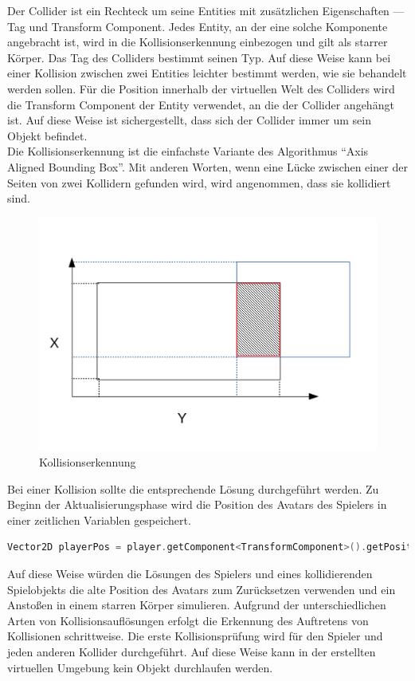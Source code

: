 \documentclass[
  10pt,
  a4paper,
  oneside,
  headers,
  headinclude,
  footinclude,
  BCOR5mm,
]{article}
\begin{document}
Der Collider ist ein Rechteck um seine Entities mit zusätzlichen Eigenschaften
--- Tag und Transform Component. Jedes Entity, an der eine solche Komponente
angebracht ist, wird in die Kollisionserkennung einbezogen und gilt als starrer
Körper. Das Tag des Colliders bestimmt seinen Typ. Auf diese Weise kann bei
einer Kollision zwischen zwei Entities leichter bestimmt werden, wie sie
behandelt werden sollen. Für die Position innerhalb der virtuellen Welt des
Colliders wird die Transform Component der Entity verwendet, an die der Collider
angehängt ist. Auf diese Weise ist sichergestellt, dass sich der Collider immer
um sein Objekt befindet. \\
Die Kollisionserkennung ist die einfachste Variante des Algorithmus ``Axis
Aligned Bounding Box''. Mit anderen Worten, wenn eine Lücke zwischen einer der
Seiten von zwei Kollidern gefunden wird, wird angenommen, dass sie kollidiert
sind.

\begin{figure}[h]
  \centering
  \includegraphics[scale=0.75]{AABB_Collision}
  \caption{Kollisionserkennung}
  \label{fig:Kollisionserkennung}
\end{figure}

Bei einer Kollision sollte die entsprechende Lösung durchgeführt werden. Zu
Beginn der Aktualisierungsphase wird die Position des Avatars des Spielers in
einer zeitlichen Variablen gespeichert.

\begin{lstlisting}[language=C++]
Vector2D playerPos = player.getComponent<TransformComponent>().getPosition();
\end{lstlisting}

Auf diese Weise würden die Lösungen des Spielers und eines kollidierenden
Spielobjekts die alte Position des Avatars zum Zurücksetzen verwenden und ein
Anstoßen in einem starren Körper simulieren. Aufgrund der unterschiedlichen
Arten von Kollisionsauflösungen erfolgt die Erkennung des Auftretens von
Kollisionen schrittweise. Die erste Kollisionsprüfung wird für den Spieler und
jeden anderen Kollider durchgeführt. Auf diese Weise kann in der erstellten
virtuellen Umgebung kein Objekt durchlaufen werden.
\end{document}
